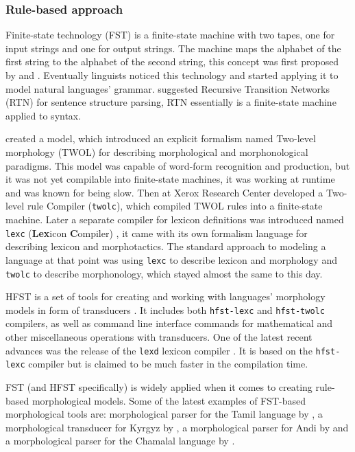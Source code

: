 \subsubsection{Rule-based approach}
\par Finite-state technology (FST) is a finite-state machine with two tapes, one for input strings and one for output strings. The machine maps the alphabet of the first string to the alphabet of the second string, this concept was first proposed by \textcite{mealy_method_1955} and \textcite{moore_gedanken_1955}. Eventually linguists noticed this technology and started applying it to model natural languages' grammar. \textcite{woods_trans_1970} suggested Recursive Transition Networks (RTN) for sentence structure parsing, RTN essentially is a finite-state machine applied to syntax. 
\par \textcite{koskenniemi_twol_1983} created a model, which introduced an explicit formalism named Two-level morphology (TWOL) for describing morphological and morphonological paradigms. This model was capable of word-form recognition and production, but it was not yet compilable into finite-state machines, it was working at runtime and was known for being slow. Then \textcite{karttunen_twolc_1987} at Xerox Research Center developed a Two-level rule Compiler (\texttt{twolc}), which compiled TWOL rules into a finite-state machine. Later a separate compiler for lexicon definitions was introduced named \texttt{lexc} (\textbf{Lex}icon \textbf{C}ompiler) \parencite{karttunen_lexc_1993}, it came with its own formalism language for describing lexicon and morphotactics. The standard approach to modeling a language at that point was using \texttt{lexc} to describe lexicon and morphology and \texttt{twolc} to describe morphonology, which stayed almost the same to this day. 
\par HFST is a set of tools for creating and working with languages' morphology models in form of transducers \parencite{linden_hfst_2009}. It includes both \texttt{hfst-lexc} and \texttt{hfst-twolc} compilers, as well as command line interface commands for mathematical and other miscellaneous operations with transducers. One of the latest recent advances was the release of the \texttt{lexd} lexicon compiler \parencite{swanson_lexd_2021}. It is based on the \texttt{hfst-lexc} compiler but is claimed to be much faster in the compilation time.
\par FST (and HFST specifically) is widely applied when it comes to creating rule-based morphological models. Some of the latest examples of FST-based morphological tools are: morphological parser for the Tamil language by \textcite{sarveswaran_morph_2021}, a morphological transducer for Kyrgyz by \textcite{washington_finite_2012}, a morphological parser for Andi by \textcite{buntyakova_2023_twol} and a morphological parser for the Chamalal language by \textcite{budilova_2023_twol}.